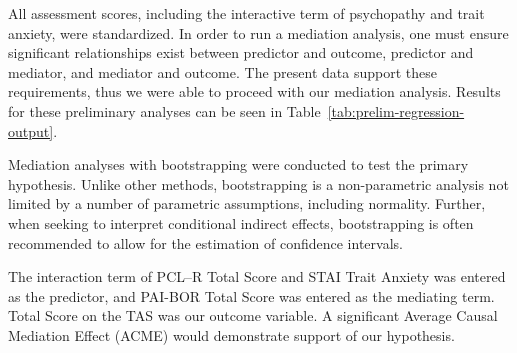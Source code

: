 \documentclass[
  man,floatsintext]{apa7}
\begin{document}
All assessment scores, including the interactive term of psychopathy and trait anxiety, were standardized. In order to run a mediation analysis, one must ensure significant relationships exist between predictor and outcome, predictor and mediator, and mediator and outcome. The present data support these requirements, thus we were able to proceed with our mediation analysis. Results for these preliminary analyses can be seen in Table~\ref{tab:prelim-regression-output}.

Mediation analyses with bootstrapping were conducted to test the primary hypothesis. Unlike other methods, bootstrapping is a non-parametric analysis not limited by a number of parametric assumptions, including normality. Further, when seeking to interpret conditional indirect effects, bootstrapping is often recommended to allow for the estimation of confidence intervals.

The interaction term of PCL--R Total Score and STAI Trait Anxiety was entered as the predictor, and PAI-BOR Total Score was entered as the mediating term. Total Score on the TAS was our outcome variable. A significant Average Causal Mediation Effect (ACME) would demonstrate support of our hypothesis.
\end{document}
